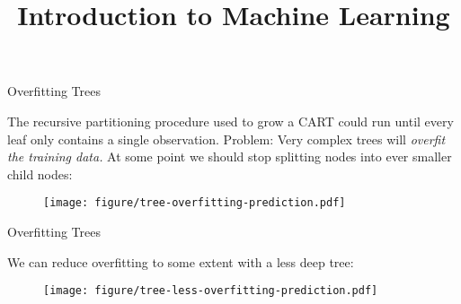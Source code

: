 \documentclass[11pt,compress,t,notes=noshow, xcolor=table]{beamer}
\title{Introduction to Machine Learning}
\begin{document}





\begin{vbframe}{Overfitting Trees}

The recursive partitioning procedure used to grow a CART could run until every leaf only contains a single observation. Problem: Very complex trees will \emph{overfit the training data.} At some point we should stop splitting nodes into ever smaller child nodes: 

\begin{figure}
\centering
\texttt{[image: figure/tree-overfitting-prediction.pdf]}
\end{figure}


\end{vbframe}

\begin{vbframe}{Overfitting Trees}

We can reduce overfitting to some extent with a less deep tree:
\vspace{0.25cm}

\begin{figure}
\centering
\texttt{[image: figure/tree-less-overfitting-prediction.pdf]}
\end{figure}

\end{vbframe}
\end{document}
